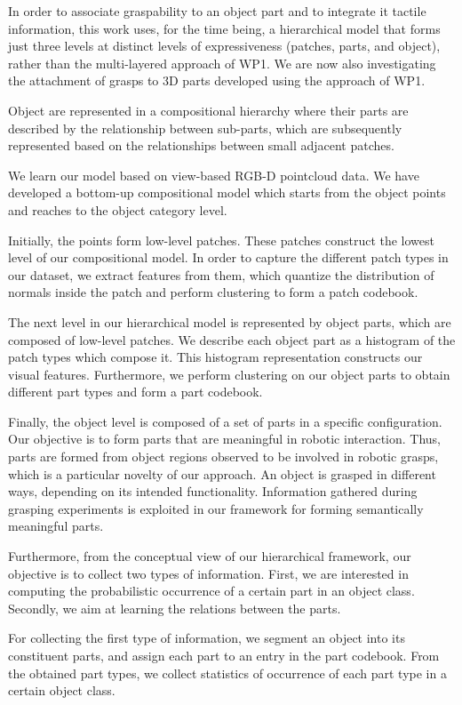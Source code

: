 \documentclass[a4paper,11pt,pdf]{pacmanreport}
\begin{document}
In order to associate graspability to an object part and to integrate it tactile information, this work uses, for the time being, a hierarchical model 
that forms just three levels at distinct levels of expressiveness (patches, 
parts, and object), rather than the multi-layered approach of WP1. We are now 
also investigating the attachment of grasps to 3D parts developed using the 
approach of WP1.

Object are represented in a compositional hierarchy where their parts are described by the relationship between sub-parts, which are subsequently represented based on the relationships between small adjacent patches.

We learn our model based on view-based RGB-D pointcloud data. We have developed a bottom-up compositional model which starts from the object points and reaches to the object category level.

Initially, the points form low-level patches. These patches construct the lowest level of our compositional model. In order to capture the different patch types in our dataset, we extract features from them, which quantize the distribution of normals inside the patch and
perform clustering to form a patch codebook.

The next level in our hierarchical model is represented by object parts, which are composed of low-level patches. We describe each object part as a histogram of the patch types which compose it. This histogram representation constructs our visual features. Furthermore, we perform clustering on our object parts to obtain different part types and form a part codebook.

Finally, the object level is composed of a set of parts in a specific
configuration. Our objective is to form
parts that are meaningful in robotic interaction.  Thus, parts are
formed from object regions observed to be involved in robotic grasps,
which is a particular novelty of our approach. An object is grasped in
different ways, depending on its intended functionality.  Information
gathered during grasping experiments is exploited in our framework for
forming semantically meaningful parts.

Furthermore, from the conceptual view of our hierarchical framework, our objective is to collect two types of information. First, we are interested in computing the probabilistic occurrence of a certain part in an object class. Secondly, we aim at learning the relations between the parts.

For collecting the first type of information, we segment an object
into its constituent parts, and assign each part to an entry in the
part codebook. From the obtained part types, we collect statistics of
occurrence of each part type in a certain object class.
\end{document}
